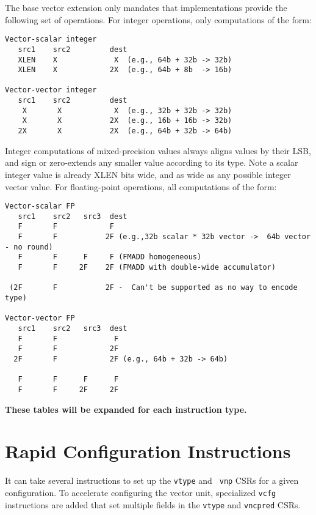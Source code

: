The base vector extension only mandates that implementations provide
the following set of operations.  For integer operations, only
computations of the form:
\begin{verbatim}
Vector-scalar integer
   src1    src2         dest
   XLEN    X             X  (e.g., 64b + 32b -> 32b)
   XLEN    X            2X  (e.g., 64b + 8b  -> 16b)

Vector-vector integer
   src1    src2         dest
    X       X            X  (e.g., 32b + 32b -> 32b)
    X       X           2X  (e.g., 16b + 16b -> 32b)
   2X       X           2X  (e.g., 64b + 32b -> 64b)
\end{verbatim}
Integer computations of mixed-precision values always aligns values by
their LSB, and sign or zero-extends any smaller value according to its
type.  Note a scalar integer value is already XLEN bits wide, and as
wide as any possible integer vector value.
\newpage
For floating-point operations, all computations of the form:
\begin{verbatim}
Vector-scalar FP
   src1    src2   src3  dest
   F       F            F
   F       F           2F (e.g.,32b scalar * 32b vector ->  64b vector - no round)
   F       F      F     F (FMADD homogeneous)
   F       F     2F    2F (FMADD with double-wide accumulator)
 
 (2F       F           2F -  Can't be supported as no way to encode type)

Vector-vector FP
   src1    src2   src3  dest
   F       F             F
   F       F            2F
  2F       F            2F (e.g., 64b + 32b -> 64b)

   F       F      F      F
   F       F     2F     2F
\end{verbatim}

{\bf These tables will be expanded for each instruction type.}

\section{Rapid Configuration Instructions}


It can take several instructions to set up the {\tt vtype} and {\tt
  vnp} CSRs for a given configuration.  To accelerate configuring
the vector unit, specialized {\tt vcfg} instructions are added that
set multiple fields in the {\tt vtype} and {\tt vncpred} CSRs.


